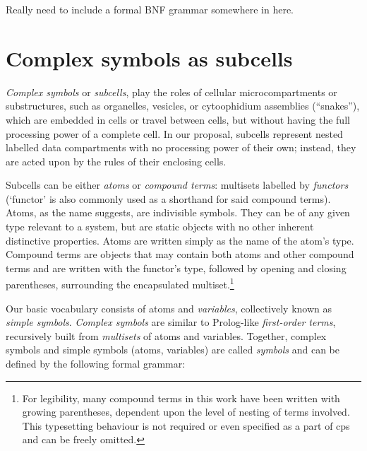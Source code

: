 \begin{anfxwarning}
Really need to include a formal BNF grammar somewhere in here.
\end{anfxwarning}


\section{Complex symbols as subcells}

\emph{Complex symbols} or \emph{subcells}, 
play the roles of cellular microcompartments or substructures,
such as organelles, vesicles, or cytoophidium assemblies (``snakes''),
which are embedded in cells or travel between cells, 
but without having the full processing power of a complete cell.
In our proposal, subcells represent nested labelled data compartments
with no processing power of their own;
instead, they are acted upon by the rules of their enclosing cells.

Subcells can be either \emph{atoms} or \emph{compound terms}: multisets labelled by \emph{functors} (`functor' is also commonly used as a shorthand for said compound terms).  Atoms, as the name suggests, are indivisible symbols.  They can be of any given type relevant to a system, but are static objects with no other inherent distinctive properties.  Atoms are written simply as the name of the atom's type.  Compound terms are objects that may contain both atoms and other compound terms and are written with the functor's type, followed by opening and closing parentheses, surrounding the encapsulated multiset.\footnote{For legibility, many compound terms in this work have been written with growing parentheses, dependent upon the level of nesting of terms involved.  This typesetting behaviour is not required or even specified as a part of \gls{cps} and can be freely omitted.}

Our basic vocabulary consists of atoms and \emph{variables}, collectively known as \emph{simple symbols}.  \emph{Complex symbols} are similar to Prolog-like \emph{first-order terms}, recursively built from \emph{multisets} of atoms and variables.  Together, complex symbols and simple symbols (atoms, variables) are called \emph{symbols} and can be defined by the following formal grammar:

